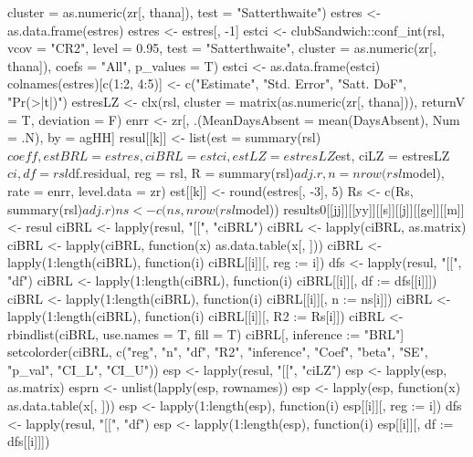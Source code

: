 \begin{Schunk}
\begin{Sinput}
{{{{{{{{{                      cluster = as.numeric(zr[, thana]), test = "Satterthwaite")
                    estres <- as.data.frame(estres)
                    estres <- estres[, -1]
                    estci <- clubSandwich::conf_int(rsl, vcov = "CR2", level = 0.95, 
                      test = "Satterthwaite", cluster = as.numeric(zr[, thana]), coefs = "All", p_values = T)
                    estci <- as.data.frame(estci)
                    colnames(estres)[c(1:2, 4:5)] <- c("Estimate", "Std. Error", "Satt. DoF", "Pr(>|t|)")
                    estresLZ <- clx(rsl, cluster = matrix(as.numeric(zr[, thana])), 
                      returnV = T, deviation = F)
                    enrr <- zr[, .(MeanDaysAbsent = mean(DaysAbsent), Num = .N), by = agHH]
                    resul[[k]] <- 
                      list(est = summary(rsl)$coeff, estBRL = estres, ciBRL = estci,
                        estLZ = estresLZ$est, ciLZ = estresLZ$ci,
                        df = rsl$df.residual, reg = rsl, 
                        R = summary(rsl)$adj.r, n = nrow(rsl$model),
                        rate = enrr, level.data = zr)
                    est[[k]] <- round(estres[, -3], 5)
                    Rs <- c(Rs, summary(rsl)$adj.r)
                    ns <- c(ns, nrow(rsl$model))
                  }
                  results0[[jj]][[yy]][[s]][[j]][[ge]][[m]] <- resul
                  ciBRL <- lapply(resul, "[[", "ciBRL")
                  ciBRL <- lapply(ciBRL, as.matrix)
                  ciBRL <- lapply(ciBRL, function(x) as.data.table(x[, ]))
                  ciBRL <- lapply(1:length(ciBRL), function(i) ciBRL[[i]][, reg := i])
                  dfs <- lapply(resul, "[[", "df")
                  ciBRL <- lapply(1:length(ciBRL), function(i) ciBRL[[i]][, df := dfs[[i]]])
                  ciBRL <- lapply(1:length(ciBRL), function(i) ciBRL[[i]][, n := ns[i]])
                  ciBRL <- lapply(1:length(ciBRL), function(i) ciBRL[[i]][, R2 := Rs[i]])
                  ciBRL <- rbindlist(ciBRL, use.names = T, fill = T)
                  ciBRL[, inference := "BRL"]
                  setcolorder(ciBRL,  c("reg", "n", "df", "R2", "inference", "Coef", "beta", "SE", "p_val", "CI_L", "CI_U"))
                  esp <- lapply(resul, "[[", "ciLZ")
                  esp <- lapply(esp, as.matrix)
                  esprn <- unlist(lapply(esp, rownames))
                  esp <- lapply(esp, function(x) as.data.table(x[, ]))
                  esp <- lapply(1:length(esp), function(i) esp[[i]][, reg := i])
                  dfs <- lapply(resul, "[[", "df")
                  esp <- lapply(1:length(esp), function(i) esp[[i]][, df := dfs[[i]]])
}}}}}}}}
\end{Sinput}
\end{Schunk}
